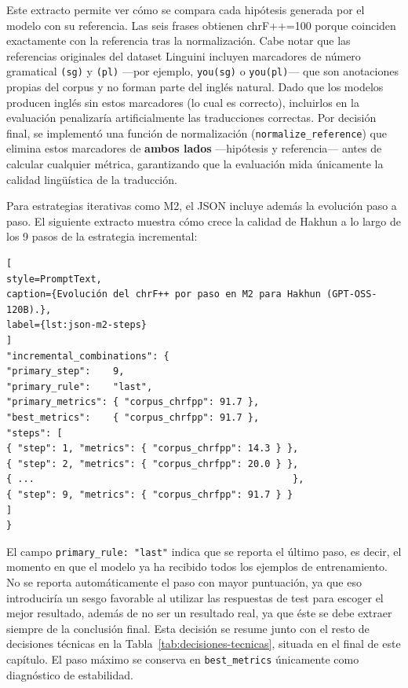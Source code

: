 Este extracto permite ver cómo se compara cada hipótesis generada por el modelo con su referencia. Las seis frases obtienen chrF++=100 porque coinciden exactamente con la referencia tras la normalización. Cabe notar que las referencias originales del dataset Linguini incluyen marcadores de número gramatical \texttt{(sg)} y \texttt{(pl)} —por ejemplo, \texttt{you(sg)} o \texttt{you(pl)}— que son anotaciones propias del corpus y no forman parte del inglés natural. Dado que los modelos producen inglés sin estos marcadores (lo cual es correcto), incluirlos en la evaluación penalizaría artificialmente las traducciones correctas. Por decisión final, se implementó una función de normalización (\texttt{normalize\_reference}) que elimina estos marcadores de \textbf{ambos lados} —hipótesis y referencia— antes de calcular cualquier métrica, garantizando que la evaluación mida únicamente la calidad lingüística de la traducción.

Para estrategias iterativas como M2, el JSON incluye además la evolución paso a paso. El siguiente extracto muestra cómo crece la calidad de Hakhun a lo largo de los 9 pasos de la estrategia incremental:

\begin{lstlisting}[
style=PromptText,
caption={Evolución del chrF++ por paso en M2 para Hakhun (GPT-OSS-120B).},
label={lst:json-m2-steps}
]
"incremental_combinations": {
"primary_step":    9,
"primary_rule":    "last",
"primary_metrics": { "corpus_chrfpp": 91.7 },
"best_metrics":    { "corpus_chrfpp": 91.7 },
"steps": [
{ "step": 1, "metrics": { "corpus_chrfpp": 14.3 } },
{ "step": 2, "metrics": { "corpus_chrfpp": 20.0 } },
{ ...                                              },
{ "step": 9, "metrics": { "corpus_chrfpp": 91.7 } }
]
}
\end{lstlisting}

El campo \texttt{primary\_rule: "last"} indica que se reporta el último paso, es decir, el momento en que el modelo ya ha recibido todos los ejemplos de entrenamiento. No se reporta automáticamente el paso con mayor puntuación, ya que eso introduciría un sesgo favorable al utilizar las respuestas de test para escoger el mejor resultado, además de no ser un resultado real, ya que éste se debe extraer siempre de la conclusión final. Esta decisión se resume junto con el resto de decisiones técnicas en la Tabla~\ref{tab:decisiones-tecnicas}, situada en el final de este capítulo. El paso máximo se conserva en \texttt{best\_metrics} únicamente como diagnóstico de estabilidad.

